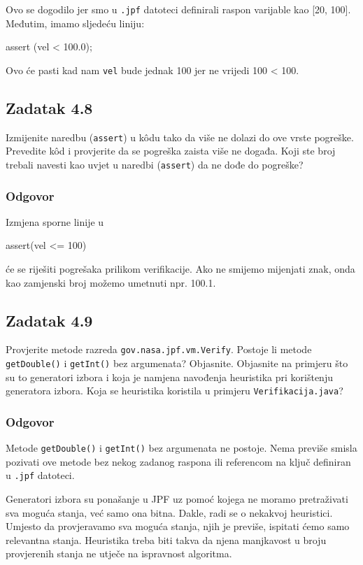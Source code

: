 \documentclass{article}
\newcommand{\zadatak}[1]{\subsection{Zadatak #1}}
\newcommand{\odgovor}{\subsubsection*{Odgovor}}
\newcommand{\code}[1]{\colorbox{blue!11}{\texttt{#1}}}
\begin{document}
\noindent
Ovo se dogodilo jer smo u \texttt{.jpf} datoteci definirali raspon varijable kao [20, 100]. Međutim, imamo sljedeću liniju:

\begin{ccode}
assert (vel < 100.0);
\end{ccode}

\noindent
Ovo će pasti kad nam \texttt{vel} bude jednak 100 jer ne vrijedi 100 < 100.

\zadatak{4.8}

Izmijenite naredbu (\texttt{assert}) u kôdu tako da više ne dolazi do ove vrste pogreške. Prevedite kôd i provjerite da se pogreška zaista više ne događa. Koji ste broj trebali navesti kao uvjet u naredbi (\texttt{assert}) da ne dođe do pogreške? 

\odgovor

Izmjena sporne linije u

\begin{ccode}
assert(vel <= 100)
\end{ccode}

\noindent
će se riješiti pogrešaka prilikom verifikacije. Ako ne smijemo mijenjati znak, onda kao zamjenski broj možemo umetnuti npr. 100.1.

\pagebreak  %

\zadatak{4.9}

Provjerite metode razreda \texttt{gov.nasa.jpf.vm.Verify}. Postoje li metode\newline
\code{getDouble()} i \code{getInt()} bez argumenata? Objasnite. Objasnite na primjeru što su to generatori izbora i koja je namjena navođenja heuristika pri korištenju generatora izbora. Koja se heuristika koristila u primjeru \texttt{Verifikacija.java}?

\odgovor

Metode \code{getDouble()} i \code{getInt()} bez argumenata ne postoje. Nema previše smisla pozivati ove metode bez nekog zadanog raspona ili referencom na ključ definiran u \texttt{.jpf} datoteci.\newline

\noindent
Generatori izbora su ponašanje u JPF uz pomoć kojega ne moramo pretraživati sva moguća stanja, već samo ona bitna. Dakle, radi se o nekakvoj heuristici. Umjesto da provjeravamo sva moguća stanja, njih je previše, ispitati ćemo samo relevantna stanja. Heuristika treba biti takva da njena manjkavost u broju provjerenih stanja ne utječe na ispravnost algoritma.

\pagebreak
\end{document}
